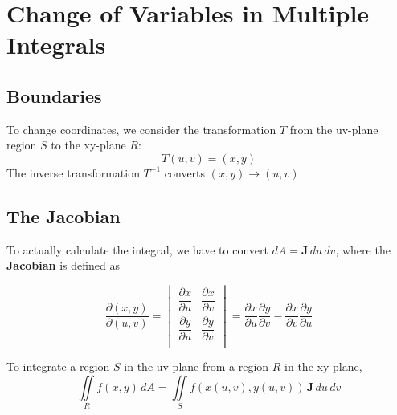 \documentclass{report}  %
\begin{document}
\section{Change of Variables in Multiple Integrals}
\subsection*{Boundaries}
To change coordinates, we consider the transformation $T$ from the uv-plane region $S$ to the xy-plane $R$:
$$T(u,v) = (x,y)$$
The inverse transformation $T^{-1}$ converts $(x, y) \to (u, v)$. 

\subsection*{The Jacobian}
To actually calculate the integral, we have to convert $dA = \mathbf{J} \, du \, dv$,
where the \textbf{Jacobian} is defined as

\begin{equation}
	\frac{\partial (x,y)}{\partial (u,v)} = 
	\begin{vmatrix}
		\dfrac{\partial x}{\partial u}& \dfrac{\partial x}{\partial v}\\[1em]
		\dfrac{\partial y}{\partial u}& \dfrac{\partial y}{\partial v}\\
	\end{vmatrix}
	= \frac{\partial x}{\partial u} \frac{\partial y}{\partial v} - 
	  \frac{\partial x}{\partial v} \frac{\partial y}{\partial u}
\end{equation}

To integrate a region $S$ in the uv-plane from a region $R$ in the xy-plane, 
\begin{equation}
	\iint \limits_R f(x,y) \, dA = \iint \limits_S f(x(u,v), y(u,v)) \,
	\mathbf{J} \, du \, dv
\end{equation}
\end{document}
